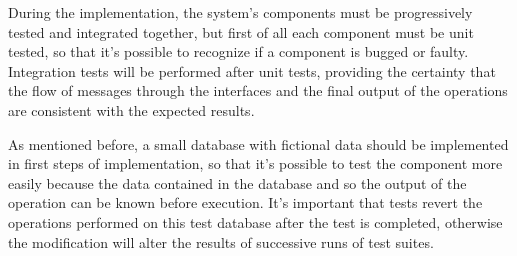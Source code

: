 During the implementation, the system's components must be progressively tested and integrated together, but first of all each component must be unit tested, so that it's possible to recognize if a component is bugged or faulty. Integration tests will be performed after unit tests, providing the certainty that the flow of messages through the interfaces and the final output of the operations are consistent with the expected results.

As mentioned before, a small database with fictional data should be implemented in first steps of implementation, so that it's possible to test the component more easily because the data contained in the database and so the output of the operation can be known before execution. It's important that tests revert the operations performed on this test database after the test is completed, otherwise the modification will alter the results of successive runs of test suites.